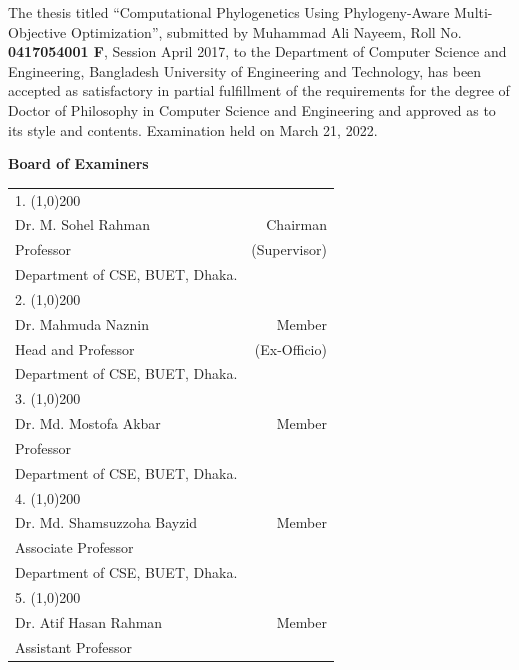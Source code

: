 \begin{singlespace}
\small{
 The thesis titled ``Computational Phylogenetics Using Phylogeny-Aware Multi-Objective Optimization'', submitted by Muhammad Ali Nayeem, Roll No.
 \textbf{0417054001 F}, Session April 2017, to the Department of Computer Science
 and Engineering, Bangladesh University of Engineering and Technology, has been accepted as satisfactory 
 in partial fulfillment of the requirements for the degree of Doctor of Philosophy in Computer Science and Engineering and approved as to its style and contents. Examination held on March 21, 2022. \\ 
 
 \begin{spacing}{0.5}	
 \begin{center}
 	\textbf{\Large Board of Examiners}
 \end{center}
 \begin{tabular}{p{12cm} r }
 	\vspace{0.1cm}
 	1. \line(1,0){200} &  \\
 	Dr. M. Sohel Rahman & Chairman\\ 
 	Professor & (Supervisor)\\
 	Department of CSE, BUET, Dhaka.  & \\
 	\vspace{0.1cm}
 	2. \line(1,0){200} &  \\
 	Dr. Mahmuda Naznin & Member\\ 
 	Head and Professor & (Ex-Officio)\\
  	Department of CSE, BUET, Dhaka.  & \\
 	\vspace{0.1cm}
 	3. \line(1,0){200} &  \\
 	Dr. Md. Mostofa Akbar & Member\\ 
 	Professor & \\
 	Department of CSE, BUET, Dhaka.  & \\
 	\vspace{0.1cm}
 	4. \line(1,0){200} &  \\
 	Dr. Md. Shamsuzzoha Bayzid  & Member\\ 
 	Associate Professor & \\
 	Department of CSE, BUET, Dhaka.  & \\
 	\vspace{0.1cm}
 	5. \line(1,0){200} &  \\
 	Dr. Atif Hasan Rahman  & Member\\ 
 	Assistant Professor & \\

\end{tabular}
\end{spacing}}
\end{singlespace}
